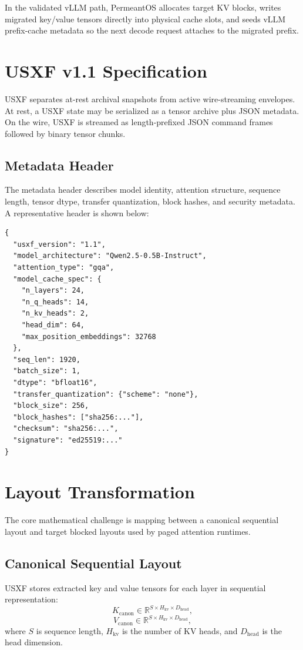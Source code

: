 \documentclass[11pt]{article}
\begin{document}
In the validated vLLM path, PermeantOS allocates target KV blocks, writes migrated key/value tensors directly into physical cache slots, and seeds vLLM prefix-cache metadata so the next decode request attaches to the migrated prefix.

\section{USXF v1.1 Specification}

USXF separates at-rest archival snapshots from active wire-streaming envelopes. At rest, a USXF state may be serialized as a tensor archive plus JSON metadata. On the wire, USXF is streamed as length-prefixed JSON command frames followed by binary tensor chunks.

\subsection{Metadata Header}

The metadata header describes model identity, attention structure, sequence length, tensor dtype, transfer quantization, block hashes, and security metadata. A representative header is shown below:

\begin{verbatim}
{
  "usxf_version": "1.1",
  "model_architecture": "Qwen2.5-0.5B-Instruct",
  "attention_type": "gqa",
  "model_cache_spec": {
    "n_layers": 24,
    "n_q_heads": 14,
    "n_kv_heads": 2,
    "head_dim": 64,
    "max_position_embeddings": 32768
  },
  "seq_len": 1920,
  "batch_size": 1,
  "dtype": "bfloat16",
  "transfer_quantization": {"scheme": "none"},
  "block_size": 256,
  "block_hashes": ["sha256:..."],
  "checksum": "sha256:...",
  "signature": "ed25519:..."
}
\end{verbatim}

\section{Layout Transformation}

The core mathematical challenge is mapping between a canonical sequential layout and target blocked layouts used by paged attention runtimes.

\subsection{Canonical Sequential Layout}

USXF stores extracted key and value tensors for each layer in sequential representation:
\begin{equation}
K_{\text{canon}} \in \mathbb{R}^{S \times H_{\text{kv}} \times D_{\text{head}}},
\end{equation}
\begin{equation}
V_{\text{canon}} \in \mathbb{R}^{S \times H_{\text{kv}} \times D_{\text{head}}},
\end{equation}
where $S$ is sequence length, $H_{\text{kv}}$ is the number of KV heads, and $D_{\text{head}}$ is the head dimension.
\end{document}
